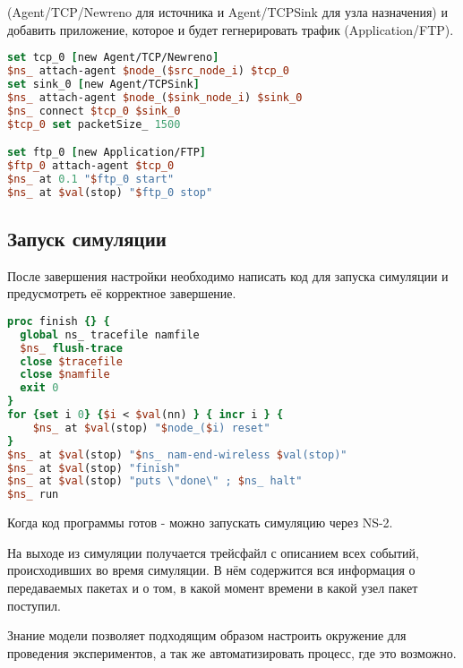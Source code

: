 (Agent/TCP/Newreno для источника и Agent/TCPSink для узла назначения) и добавить приложение, которое и будет гегнерировать трафик (Application/FTP).

\begin{lstlisting}[language=tcl, style=mystyle, caption=Генерация траффика]
set tcp_0 [new Agent/TCP/Newreno]
$ns_ attach-agent $node_($src_node_i) $tcp_0
set sink_0 [new Agent/TCPSink]
$ns_ attach-agent $node_($sink_node_i) $sink_0
$ns_ connect $tcp_0 $sink_0
$tcp_0 set packetSize_ 1500

set ftp_0 [new Application/FTP]
$ftp_0 attach-agent $tcp_0
$ns_ at 0.1 "$ftp_0 start"
$ns_ at $val(stop) "$ftp_0 stop"

\end{lstlisting}

\subsection*{Запуск симуляции}

После завершения настройки необходимо написать код для запуска симуляции и предусмотреть её корректное завершение.

\begin{lstlisting}[language=tcl, style=mystyle, caption=Запуск сценария и завершение]
proc finish {} {
  global ns_ tracefile namfile
  $ns_ flush-trace
  close $tracefile
  close $namfile
  exit 0
}
for {set i 0} {$i < $val(nn) } { incr i } {
    $ns_ at $val(stop) "$node_($i) reset"
}
$ns_ at $val(stop) "$ns_ nam-end-wireless $val(stop)"
$ns_ at $val(stop) "finish"
$ns_ at $val(stop) "puts \"done\" ; $ns_ halt"
$ns_ run
\end{lstlisting}

Когда код программы готов - можно запускать симуляцию через NS-2.

На выходе из симуляции получается трейсфайл с описанием всех событий, происходивших во время симуляции. В нём содержится вся информация о передаваемых пакетах и о том, в какой момент времени в какой узел пакет поступил.

Знание модели позволяет подходящим образом настроить окружение для проведения экспериментов, а так же автоматизировать процесс, где это возможно.
 